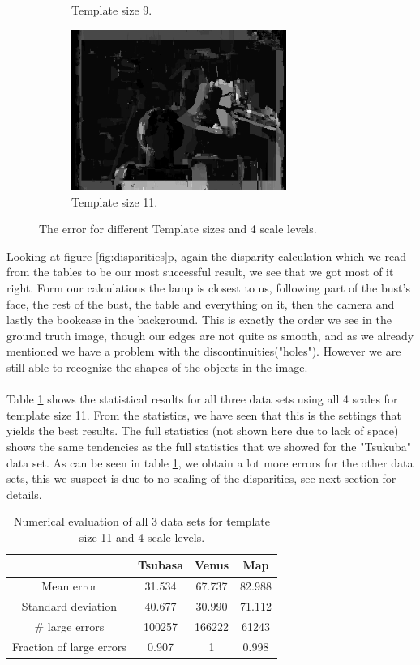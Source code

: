\documentclass[12pt,a4paper,oneside,final]{article}
\begin{document}
\begin{figure}[H]
\begin{subfigure}[b]{0.5\textwidth}
		\caption{Template size 9.}
	\end{subfigure}%
	\begin{subfigure}[b]{0.5\textwidth}
		\centering
		\includegraphics[width=7cm]{err_s4_k11set_1.png}
		\caption{Template size 11.}
	\end{subfigure}
	\caption{The error for different Template sizes and 4 scale levels.}
	\label{fig:error}
\end{figure}

Looking at figure \ref{fig:disparities}p, again the disparity calculation which we read from the tables to be our most successful result, we see that we got most of it right. Form our calculations the lamp is closest to us, following part of the bust's face, the rest of the bust, the table and everything on it, then the camera and lastly the bookcase in the background. This is exactly the order we see in the ground truth image, though our edges are not quite as smooth, and as we already mentioned we have a problem with the discontinuities("holes"). However we are still able to recognize the shapes of the objects in the image. \\\\ Table \ref{tab:numevalAll} shows the statistical results for all three data sets using all 4 scales for template size 11. From the statistics, we have seen that this is the settings that yields the best results. The full statistics (not shown here due to lack of space) shows the same tendencies as the full statistics that we showed for the "Tsukuba" data set. As can be seen in table \ref{tab:numevalAll}, we obtain a lot more errors for the other data sets, this we suspect is due to no scaling of the disparities, see next section for details. 

\begin{table}[H]
	\centering
	\begin{tabular}{c||c|c|c}
		&Tsubasa&Venus&Map\\\hline\hline
		Mean error & 31.534 & 67.737 & 82.988 \\\hline
		Standard deviation & 40.677 & 30.990 & 71.112 \\\hline
		\# large errors & 100257 & 166222 & 61243 \\\hline
		Fraction of large errors& 0.907 & 1 & 0.998
	\end{tabular}
	\caption{Numerical evaluation of all 3 data sets for template size 11 and 4 scale levels.}
	\label{tab:numevalAll}
\end{table}
\end{document}
